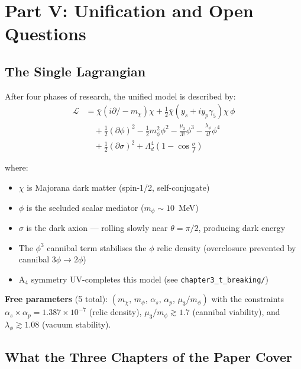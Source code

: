 \documentclass[12pt, a4paper]{article}
\begin{document}
\newpage

\section{Part V: Unification and Open Questions}

\subsection{The Single Lagrangian}

After four phases of research, the unified model is described by:
\begin{align}
  \mathcal{L} &= \bar\chi\left(i\partial\!\!\!/ - m_\chi\right)\chi
   + \frac{1}{2}\bar\chi\left(y_s + iy_p\gamma_5\right)\chi\,\phi \nonumber\\
   &\quad + \frac{1}{2}(\partial\phi)^2 - \frac{1}{2}m_\phi^2\phi^2 
   - \frac{\mu_3}{3!}\phi^3 - \frac{\lambda_\phi}{4!}\phi^4 \nonumber\\
   &\quad + \frac{1}{2}(\partial\sigma)^2 + \Lambda_d^4\left(1 - \cos\frac{\sigma}{f}\right)
\end{align}

where:
\begin{itemize}
  \item $\chi$ is Majorana dark matter (spin-1/2, self-conjugate)
  \item $\phi$ is the secluded scalar mediator ($m_\phi \sim 10$~MeV)
  \item $\sigma$ is the dark axion --- rolling slowly near $\theta = \pi/2$, producing dark energy
  \item The $\phi^3$ cannibal term stabilises the $\phi$ relic density (overclosure prevented by cannibal $3\phi \to 2\phi$)
  \item A$_4$ symmetry UV-completes this model (see \texttt{chapter3\_t\_breaking/})
\end{itemize}

\textbf{Free parameters} (5 total):
$(m_\chi,\, m_\phi,\, \alpha_s,\, \alpha_p,\, \mu_3/m_\phi)$
with the constraints $\alpha_s \times \alpha_p = 1.387 \times 10^{-7}$ (relic density), $\mu_3/m_\phi \gtrsim 1.7$ (cannibal viability), and $\lambda_\phi \gtrsim 1.08$ (vacuum stability).

\subsection{What the Three Chapters of the Paper Cover}
\end{document}
